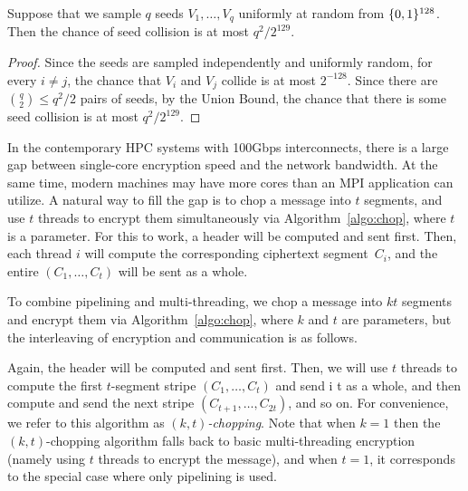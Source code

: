\begin{proposition}
Suppose that we sample $q$ seeds $V_1, \ldots, V_q$ uniformly at random from $\{0,1\}^{128}$.
Then the chance of seed collision is at most $q^2 / 2^{129}$.
\end{proposition}
\begin{proof}
Since the seeds are sampled independently and uniformly random,
for every $i \ne j$, the chance that $V_i$ and $V_j$ collide is at most $2^{-128}$.
Since there are ${q \choose 2} \leq q^2 /2$ pairs of seeds,
by the Union Bound, the chance that there is some seed collision is at most $q^2 / 2^{129}$.
\end{proof}

In the contemporary HPC systems with 100Gbps interconnects, there is a large gap
between single-core encryption speed and the network bandwidth.
At the same time, modern machines may have more cores than an MPI application can
utilize. A natural way to fill the gap is to
chop a message into $t$ segments,
and use $t$ threads to encrypt them simultaneously via Algorithm~\ref{algo:chop},
where $t$ is a parameter. For this to work, a header will be computed and sent first.
Then, each thread $i$ will compute the corresponding ciphertext segment~$C_i$,
and the entire $(C_1, \ldots, C_t)$ will be sent as a whole.

  To combine pipelining and multi-threading,
we chop a message into $kt$ segments and encrypt them via Algorithm~\ref{algo:chop},
where $k$ and $t$ are parameters,
but the interleaving of encryption and communication is as follows.

Again, the header will be computed and sent first.
Then, we will use $t$ threads to compute the first $t$-segment stripe $(C_1, \ldots, C_t)$ and send i
t as a whole,
and then compute  and send the next stripe $(C_{t + 1}, \ldots, C_{2t})$, and so on.
For convenience, we refer to this algorithm as \emph{$(k, t)$-chopping}.
Note that when $k = 1$ then the
$(k, t)$-chopping algorithm falls back to basic multi-threading encryption (namely using
$t$ threads to encrypt the message),
and when $t = 1$, it corresponds to the special case where only pipelining is used.


